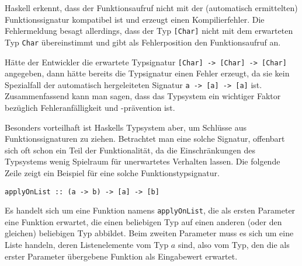 Haskell erkennt, dass der
Funktionsaufruf nicht mit der (automatisch ermittelten) Funktionssignatur kompatibel ist und erzeugt einen Kompilierfehler. Die
Fehlermeldung besagt allerdings, dass der Typ \texttt{[Char]} nicht mit dem erwarteten Typ \texttt{Char} übereinstimmt
und gibt als Fehlerposition den Funktionsaufruf an.

Hätte der Entwickler die erwartete Typsignatur \texttt{[Char] -> [Char] -> [Char]} angegeben, dann hätte bereits die Typsignatur
einen Fehler erzeugt, da sie kein Spezialfall der automatisch hergeleiteten Signatur \texttt{a -> [a] -> [a]} ist. Zusammenfassend kann man sagen, dass das Typsystem ein wichtiger Faktor bezüglich Fehleranfälligkeit und -prävention ist.

Besonders vorteilhaft ist Haskells Typsystem aber, um Schlüsse aus Funk\-tions\-sig\-na\-tu\-ren zu ziehen. Betrachtet man eine solche Signatur, offenbart sich oft schon ein Teil der Funktionalität, da die
Einschränkungen des Typsystems wenig Spielraum für unerwartetes Verhalten lassen. Die folgende Zeile zeigt ein Beispiel
für eine solche Funktionstypsignatur.
%

\begin{verbatim}
applyOnList :: (a -> b) -> [a] -> [b]
\end{verbatim}

Es handelt sich um eine Funktion namens \texttt{applyOnList}, die als ersten Parameter eine Funktion erwartet, die einen beliebigen
Typ auf einen anderen (oder den gleichen) beliebigen Typ abbildet. Beim zweiten Parameter muss es sich um eine Liste handeln,
deren Listenelemente vom Typ $a$ sind, also vom Typ, den die als erster Parameter übergebene Funktion als
Eingabewert erwartet.

